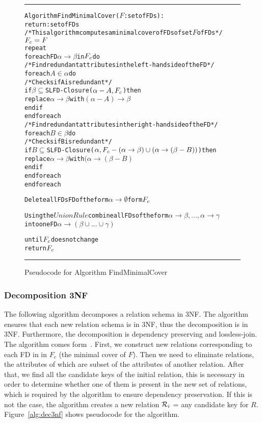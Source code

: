 \begin{figure}[htbp]
\hrule
\vspace{0.25cm}
\begin{alltt}
Algorithm FindMinimalCover(\(F\): set of FDs):
             return: set of FDs
/* This algorithm computes a minimal cover of FDs of set \(F\) of FDs */
  \(F\sb{c} = F\)
  repeat
    foreach FD \(\alpha \rightarrow \beta\) in \(F\sb{c}\) do
      /* Find redundant attributes in the left-hand side of the FD */
      foreach \(A \in \alpha\) do
        /* Checks if A is redundant */
        if \(\beta \subseteq\) SLFD-Closure(\(\alpha-A, F\sb{c}\)) then
          replace \(\alpha \rightarrow \beta\) with \((\alpha-A) \rightarrow \beta\)
        end if
      end foreach
      /* Find redundant attributes in the right-hand side of the FD */
      foreach \(B \in \beta\) do
        /* Checks if B is redundant */
        if \(B \subseteq\) SLFD-Closure(\(\alpha, F\sb{c}-(\alpha \rightarrow \beta) \cup (\alpha \rightarrow (\beta - B))\)) then
          replace \(\alpha \rightarrow \beta\) with \((\alpha \rightarrow (\beta-B)\)
        end if
      end foreach
    end foreach
    
    Delete all FDs FD of the form \(\alpha \rightarrow \emptyset\) form \(F\sb{c}\)
      
    Using the \(Union Rule\) combine all FDs of the form \(\alpha \rightarrow \beta,...,\alpha \rightarrow \gamma\)
      into one FD \(\alpha \rightarrow (\beta \cup ... \cup \gamma)\)
      
  until \(F\sb{c}\) does not change
  return \(F\sb{c}\)
\end{alltt}
\caption{Pseudocode for Algorithm FindMinimalCover}\label{alg:mincov}
\hrule
\end{figure}

\subsubsection{Decomposition 3NF}
The following algorithm decomposes a relation schema in 3NF. The algorithm
ensures that each new relation schema is in 3NF, thus the decomposition is in 3NF. 
Furthermore, the decomposition is dependency preserving and lossless-join. 
The algorithm comes form~\cite[Section 6.8]{bdb2}. 
First, we construct new relations corresponding to each FD in in $F_{c}$ (the minimal cover of $F$). 
Then we need to eliminate relations, the attributes of
which are subset of the attributes of another relation. 
After that, we find all the candidate keys of
the initial relation, this is necessary in order to determine  whether one of them is present
in the new set of relations, which is required by the algorithm to ensure
dependency preservation. If this is not the case, the algorithm creates
a new relation \(\mathcal{R}\sb{i}\) = any candidate key for \(R\).
Figure~\ref{alg:dec3nf} shows pseudocode for the algorithm.

